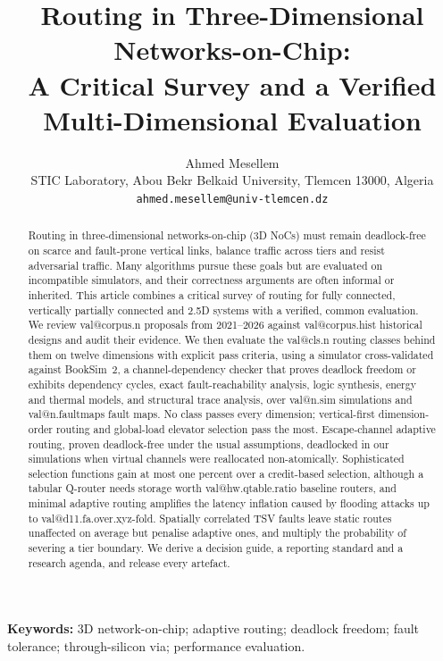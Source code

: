 \documentclass[10pt,a4paper]{article}
\title{\textbf{Routing in Three-Dimensional Networks-on-Chip:\\
A Critical Survey and a Verified Multi-Dimensional Evaluation}}
\author{Ahmed Mesellem\\[2pt]
\small STIC Laboratory, Abou Bekr Belkaid University, Tlemcen 13000, Algeria\\
\small \texttt{ahmed.mesellem@univ-tlemcen.dz}}
\date{}
\makeatletter
\newcommand{\val}[1]{\csname val@#1\endcsname}
\theoremstyle{plain}
\theoremstyle{remark}
\makeatother
\begin{document}
\maketitle

\begin{abstract}
\noindent Routing in three-dimensional networks-on-chip (3D NoCs) must remain deadlock-free on scarce and fault-prone vertical links, balance traffic across tiers and resist adversarial traffic. Many algorithms pursue these goals but are evaluated on incompatible simulators, and their correctness arguments are often informal or inherited. This article combines a critical survey of routing for fully connected, vertically partially connected and 2.5D systems with a verified, common evaluation. We review \val{corpus.n} proposals from 2021--2026 against \val{corpus.hist} historical designs and audit their evidence. We then evaluate the \val{cls.n} routing classes behind them on twelve dimensions with explicit pass criteria, using a simulator cross-validated against BookSim~2, a channel-dependency checker that proves deadlock freedom or exhibits dependency cycles, exact fault-reachability analysis, logic synthesis, energy and thermal models, and structural trace analysis, over \val{n.sim} simulations and \val{n.faultmaps} fault maps. No class passes every dimension; vertical-first dimension-order routing and global-load elevator selection pass the most. Escape-channel adaptive routing, proven deadlock-free under the usual assumptions, deadlocked in our simulations when virtual channels were reallocated non-atomically. Sophisticated selection functions gain at most one percent over a credit-based selection, although a tabular Q-router needs storage worth \val{hw.qtable.ratio} baseline routers, and minimal adaptive routing amplifies the latency inflation caused by flooding attacks up to \val{d11.fa.over.xyz}-fold. Spatially correlated TSV faults leave static routes unaffected on average but penalise adaptive ones, and multiply the probability of severing a tier boundary. We derive a decision guide, a reporting standard and a research agenda, and release every artefact.
\end{abstract}

\noindent\textbf{Keywords:} 3D network-on-chip; adaptive routing; deadlock freedom; fault tolerance; through-silicon via; performance evaluation.
\end{document}
